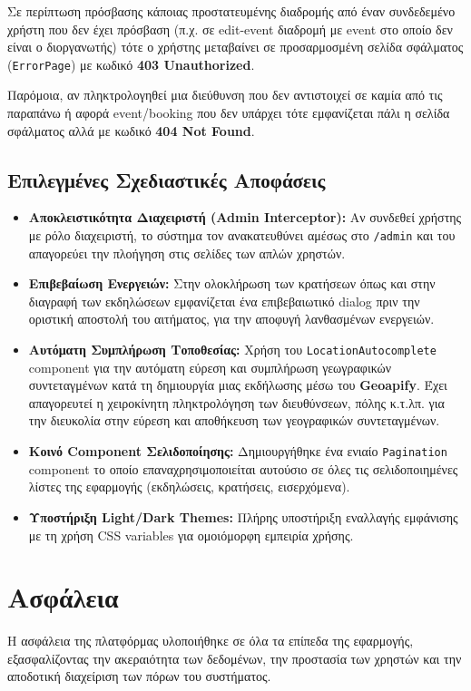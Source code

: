 \documentclass[12pt]{fphw}
\newcommand{\en}[1]{\foreignlanguage{english}{#1}}
\begin{document}
Σε περίπτωση πρόσβασης κάποιας προστατευμένης διαδρομής από έναν συνδεδεμένο χρήστη που δεν έχει πρόσβαση (π.χ. σε \en{edit-event} διαδρομή με event στο οποίο δεν είναι ο διοργανωτής) τότε ο χρήστης μεταβαίνει σε προσαρμοσμένη σελίδα σφάλματος (\en{\texttt{ErrorPage}}) με κωδικό \textbf{\en{403 Unauthorized}}.

Παρόμοια, αν πληκτρολογηθεί μια διεύθυνση που δεν αντιστοιχεί σε καμία από τις παραπάνω ή αφορά \en{event/booking} που δεν υπάρχει τότε εμφανίζεται πάλι η σελίδα σφάλματος αλλά με κωδικό \textbf{\en{404 Not Found}}.

\subsection{Επιλεγμένες Σχεδιαστικές Αποφάσεις}
\begin{itemize}[label=\textbullet, leftmargin=*]
    \item \textbf{Αποκλειστικότητα Διαχειριστή (Admin Interceptor):} Αν συνδεθεί χρήστης με ρόλο διαχειριστή, το σύστημα τον ανακατευθύνει αμέσως στο \en{\texttt{/admin}} και του απαγορεύει την πλοήγηση στις σελίδες των απλών χρηστών.
    \item \textbf{Επιβεβαίωση Ενεργειών:} Στην ολοκλήρωση των κρατήσεων όπως και στην διαγραφή των εκδηλώσεων εμφανίζεται ένα επιβεβαιωτικό \en{dialog} πριν την οριστική αποστολή του αιτήματος, για την αποφυγή λανθασμένων ενεργειών.
    \item \textbf{Αυτόματη Συμπλήρωση Τοποθεσίας:} Χρήση του \en{\texttt{LocationAutocomplete}} component για την αυτόματη εύρεση και συμπλήρωση γεωγραφικών συντεταγμένων κατά τη δημιουργία μιας εκδήλωσης μέσω του \en{\textbf{Geoapify}}. Έχει απαγορευτεί η χειροκίνητη πληκτρολόγηση των διευθύνσεων, πόλης κ.τ.λπ. για την διευκολία στην εύρεση και αποθήκευση των γεογραφικών συντεταγμένων.
    \item \textbf{Κοινό Component Σελιδοποίησης:} Δημιουργήθηκε ένα ενιαίο \en{\texttt{Pagination}} component το οποίο επαναχρησιμοποιείται αυτούσιο σε όλες τις σελιδοποιημένες λίστες της εφαρμογής (εκδηλώσεις, κρατήσεις, εισερχόμενα).
    \item \textbf{Υποστήριξη Light/Dark Themes:} Πλήρης υποστήριξη εναλλαγής εμφάνισης με τη χρήση \en{CSS variables} για ομοιόμορφη εμπειρία χρήσης.
\end{itemize}

\newpage
\section{Ασφάλεια}
Η ασφάλεια της πλατφόρμας υλοποιήθηκε σε όλα τα επίπεδα της εφαρμογής, εξασφαλίζοντας την ακεραιότητα των δεδομένων, την προστασία των χρηστών και την αποδοτική διαχείριση των πόρων του συστήματος.
\end{document}
